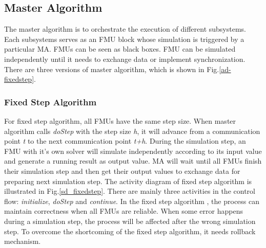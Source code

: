 \subsection{Master Algorithm}
The master algorithm is to orchestrate the execution of different subsystems. Each subsystems serves as an FMU block whose simulation is triggered by a particular MA. FMUs can be seen as black boxes. FMU can be simulated independently until it needs to exchange data or implement synchronization. There are three versions of master algorithm, which is shown in Fig.\ref{ad-fixedstep}.
\begin{figure}[htbp]
\end{figure}
\subsubsection{Fixed Step Algorithm}
For fixed step algorithm, all FMUs have the same step size. When master algorithm calls \emph{doStep} with the step size \emph{h}, it will advance from a communication point \emph{t} to the next communication point \emph{t+h}. During the simulation step, an FMU with it's own solver will simulate independently according to its input value and generate a running result as output value. MA will wait until all FMUs finish their simulation step and then get their output values to exchange data for preparing next simulation step. The activity diagram of fixed step algorithm is illustrated in Fig.\ref{sd_fixedstep}. There are mainly three activities in the control flow: \emph{initialize}, \emph{doStep} and \emph{continue}. In the fixed step algorithm \cite{BromanBGLMTW13}, the process can maintain correctness when all FMUs are reliable. When some error happens during a simulation step, the process will be affected after the wrong simulation step. To overcome the shortcoming of the fixed step algorithm, it needs rollback mechanism.
